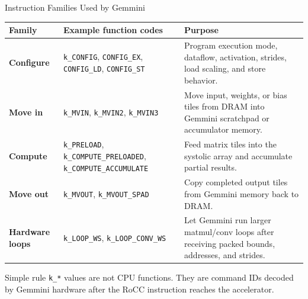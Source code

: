 \documentclass[aspectratio=169,10pt]{beamer}
\newcommand{\code}[1]{\texttt{\footnotesize #1}}
\newcommand{\edgeword}[1]{\textcolor{red!75!black}{\textbf{#1}}}
\begin{document}
\begin{frame}{Instruction Families Used by Gemmini}
  \scriptsize
  \begin{tabularx}{\textwidth}{@{}lXX@{}}
    \toprule
    Family & Example function codes & Purpose \\
    \midrule
    \edgeword{Configure} &
      \code{k\_CONFIG}, \code{CONFIG\_EX}, \code{CONFIG\_LD}, \code{CONFIG\_ST} &
      Program execution mode, dataflow, activation, strides, load scaling, and store behavior. \\
    \edgeword{Move in} &
      \code{k\_MVIN}, \code{k\_MVIN2}, \code{k\_MVIN3} &
      Move input, weights, or bias tiles from DRAM into Gemmini scratchpad or accumulator memory. \\
    \edgeword{Compute} &
      \code{k\_PRELOAD}, \code{k\_COMPUTE\_PRELOADED}, \code{k\_COMPUTE\_ACCUMULATE} &
      Feed matrix tiles into the systolic array and accumulate partial results. \\
    \edgeword{Move out} &
      \code{k\_MVOUT}, \code{k\_MVOUT\_SPAD} &
      Copy completed output tiles from Gemmini memory back to DRAM. \\
    \edgeword{Hardware loops} &
      \code{k\_LOOP\_WS}, \code{k\_LOOP\_CONV\_WS} &
      Let Gemmini run larger matmul/conv loops after receiving packed bounds, addresses, and strides. \\
    \bottomrule
  \end{tabularx}

  \vspace{0.4em}
  \begin{block}{Simple rule}
    \code{k\_*} values are not CPU functions. They are command IDs decoded by Gemmini hardware after the RoCC instruction reaches the accelerator.
  \end{block}
\end{frame}
\end{document}
